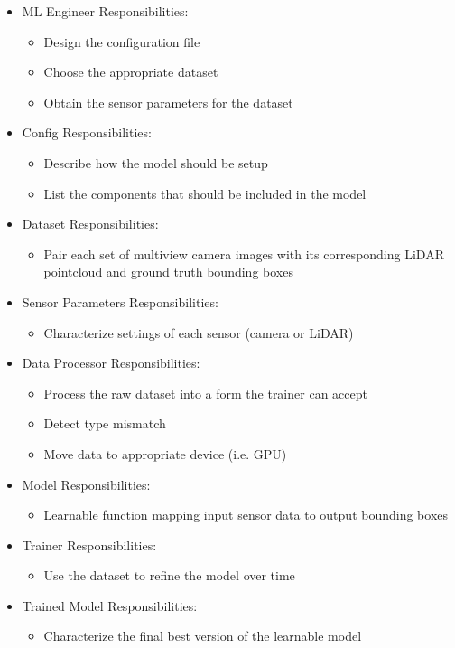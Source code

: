 \documentclass[12pt]{article}
\begin{document}
\begin{itemize}
\item ML Engineer Responsibilities:
\begin{itemize}
\item Design the configuration file
\item Choose the appropriate dataset
\item Obtain the sensor parameters for the dataset 
\end{itemize}
\item Config Responsibilities:
\begin{itemize}
\item Describe how the model should be setup
\item List the components that should be included in the model
\end{itemize}
\item Dataset Responsibilities:
\begin{itemize}
\item Pair each set of multiview camera images with its corresponding LiDAR pointcloud and ground truth bounding boxes
\end{itemize}
\item Sensor Parameters Responsibilities:
\begin{itemize}
\item Characterize settings of each sensor (camera or LiDAR)
\end{itemize}
\item Data Processor Responsibilities:
\begin{itemize}
\item Process the raw dataset into a form the trainer can accept
\item Detect type mismatch
\item Move data to appropriate device (i.e. GPU)
\end{itemize}
\item Model Responsibilities:
\begin{itemize}
\item Learnable function mapping input sensor data to output bounding boxes
\end{itemize}
\item Trainer Responsibilities:
\begin{itemize}
\item Use the dataset to refine the model over time
\end{itemize}
\item Trained Model Responsibilities:
\begin{itemize}
\item Characterize the final best version of the learnable model
\end{itemize}
\end{itemize}
\end{document}
